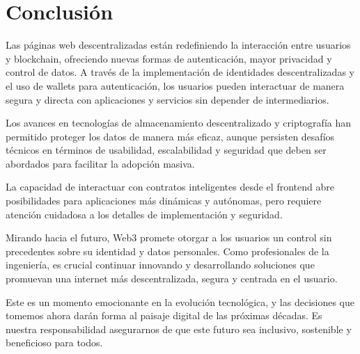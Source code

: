 \section{Conclusión}

Las páginas web descentralizadas están redefiniendo la interacción entre usuarios y blockchain, ofreciendo nuevas formas de autenticación, mayor privacidad y control de datos. A través de la implementación de identidades descentralizadas y el uso de wallets para autenticación, los usuarios pueden interactuar de manera segura y directa con aplicaciones y servicios sin depender de intermediarios.

Los avances en tecnologías de almacenamiento descentralizado y criptografía han permitido proteger los datos de manera más eficaz, aunque persisten desafíos técnicos en términos de usabilidad, escalabilidad y seguridad que deben ser abordados para facilitar la adopción masiva.

La capacidad de interactuar con contratos inteligentes desde el frontend abre posibilidades para aplicaciones más dinámicas y autónomas, pero requiere atención cuidadosa a los detalles de implementación y seguridad.

Mirando hacia el futuro, Web3 promete otorgar a los usuarios un control sin precedentes sobre su identidad y datos personales. Como profesionales de la ingeniería, es crucial continuar innovando y desarrollando soluciones que promuevan una internet más descentralizada, segura y centrada en el usuario.

Este es un momento emocionante en la evolución tecnológica, y las decisiones que tomemos ahora darán forma al paisaje digital de las próximas décadas. Es nuestra responsabilidad asegurarnos de que este futuro sea inclusivo, sostenible y beneficioso para todos.

